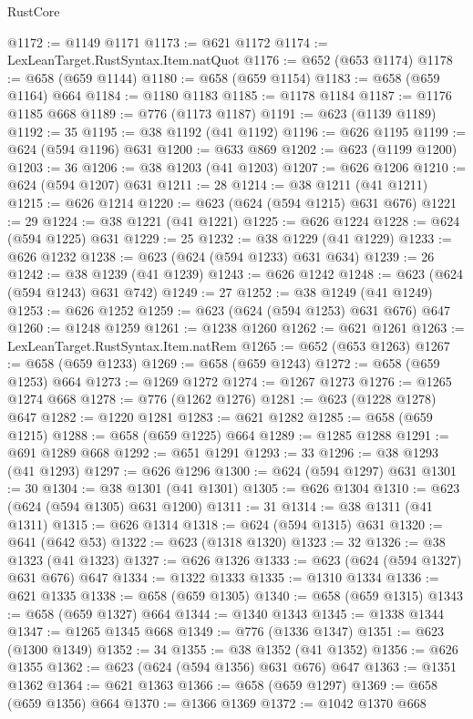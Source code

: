 \begin{lexlean}{RustCore}
\begin{coremodule}
@1172 := @1149 @1171
@1173 := @621 @1172
@1174 := LexLeanTarget.RustSyntax.Item.natQuot
@1176 := @652 (@653 @1174)
@1178 := @658 (@659 @1144)
@1180 := @658 (@659 @1154)
@1183 := @658 (@659 @1164) @664
@1184 := @1180 @1183
@1185 := @1178 @1184
@1187 := @1176 @1185 @668
@1189 := @776 (@1173 @1187)
@1191 := @623 (@1139 @1189)
@1192 := 35
@1195 := @38 @1192 (@41 @1192)
@1196 := @626 @1195
@1199 := @624 (@594 @1196) @631
@1200 := @633 @869
@1202 := @623 (@1199 @1200)
@1203 := 36
@1206 := @38 @1203 (@41 @1203)
@1207 := @626 @1206
@1210 := @624 (@594 @1207) @631
@1211 := 28
@1214 := @38 @1211 (@41 @1211)
@1215 := @626 @1214
@1220 := @623 (@624 (@594 @1215) @631 @676)
@1221 := 29
@1224 := @38 @1221 (@41 @1221)
@1225 := @626 @1224
@1228 := @624 (@594 @1225) @631
@1229 := 25
@1232 := @38 @1229 (@41 @1229)
@1233 := @626 @1232
@1238 := @623 (@624 (@594 @1233) @631 @634)
@1239 := 26
@1242 := @38 @1239 (@41 @1239)
@1243 := @626 @1242
@1248 := @623 (@624 (@594 @1243) @631 @742)
@1249 := 27
@1252 := @38 @1249 (@41 @1249)
@1253 := @626 @1252
@1259 := @623 (@624 (@594 @1253) @631 @676) @647
@1260 := @1248 @1259
@1261 := @1238 @1260
@1262 := @621 @1261
@1263 := LexLeanTarget.RustSyntax.Item.natRem
@1265 := @652 (@653 @1263)
@1267 := @658 (@659 @1233)
@1269 := @658 (@659 @1243)
@1272 := @658 (@659 @1253) @664
@1273 := @1269 @1272
@1274 := @1267 @1273
@1276 := @1265 @1274 @668
@1278 := @776 (@1262 @1276)
@1281 := @623 (@1228 @1278) @647
@1282 := @1220 @1281
@1283 := @621 @1282
@1285 := @658 (@659 @1215)
@1288 := @658 (@659 @1225) @664
@1289 := @1285 @1288
@1291 := @691 @1289 @668
@1292 := @651 @1291
@1293 := 33
@1296 := @38 @1293 (@41 @1293)
@1297 := @626 @1296
@1300 := @624 (@594 @1297) @631
@1301 := 30
@1304 := @38 @1301 (@41 @1301)
@1305 := @626 @1304
@1310 := @623 (@624 (@594 @1305) @631 @1200)
@1311 := 31
@1314 := @38 @1311 (@41 @1311)
@1315 := @626 @1314
@1318 := @624 (@594 @1315) @631
@1320 := @641 (@642 @53)
@1322 := @623 (@1318 @1320)
@1323 := 32
@1326 := @38 @1323 (@41 @1323)
@1327 := @626 @1326
@1333 := @623 (@624 (@594 @1327) @631 @676) @647
@1334 := @1322 @1333
@1335 := @1310 @1334
@1336 := @621 @1335
@1338 := @658 (@659 @1305)
@1340 := @658 (@659 @1315)
@1343 := @658 (@659 @1327) @664
@1344 := @1340 @1343
@1345 := @1338 @1344
@1347 := @1265 @1345 @668
@1349 := @776 (@1336 @1347)
@1351 := @623 (@1300 @1349)
@1352 := 34
@1355 := @38 @1352 (@41 @1352)
@1356 := @626 @1355
@1362 := @623 (@624 (@594 @1356) @631 @676) @647
@1363 := @1351 @1362
@1364 := @621 @1363
@1366 := @658 (@659 @1297)
@1369 := @658 (@659 @1356) @664
@1370 := @1366 @1369
@1372 := @1042 @1370 @668

\end{coremodule}
\end{lexlean}
